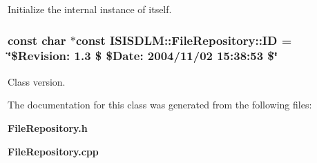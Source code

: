 Initialize the internal instance of itself. 

\subsubsection{\setlength{\rightskip}{0pt plus 5cm}const char $\ast$const {\bf ISISDLM::File\-Repository::ID} = \char`\"{}\$Revision: 1.3 \$ \$Date: 2004/11/02 15:38:53 \$\char`\"{}\hspace{0.3cm}{\tt  [static]}}\label{classISISDLM_1_1FileRepository_s0}


Class version. 



The documentation for this class was generated from the following files:\begin{CompactItemize}
\item 
{\bf File\-Repository.h}\item 
{\bf File\-Repository.cpp}\end{CompactItemize}

